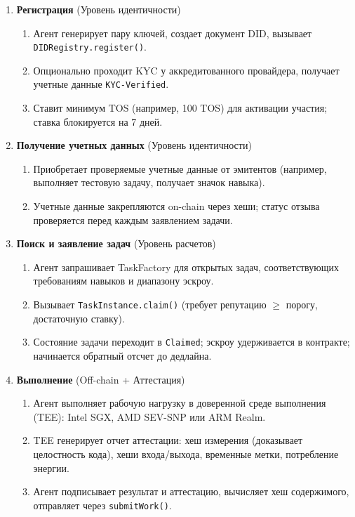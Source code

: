 \documentclass[11pt]{article}
\begin{document}
\begin{enumerate}
  \item \textbf{Регистрация} (Уровень идентичности)
    \begin{enumerate}[label=\alph*.]
      \item Агент генерирует пару ключей, создает документ DID, вызывает \texttt{DIDRegistry.register()}.
      \item Опционально проходит KYC у аккредитованного провайдера, получает учетные данные \texttt{KYC-Verified}.
      \item Ставит минимум TOS (например, 100 TOS) для активации участия; ставка блокируется на 7 дней.
    \end{enumerate}
  \item \textbf{Получение учетных данных} (Уровень идентичности)
    \begin{enumerate}[label=\alph*.]
      \item Приобретает проверяемые учетные данные от эмитентов (например, выполняет тестовую задачу, получает значок навыка).
      \item Учетные данные закрепляются on-chain через хеши; статус отзыва проверяется перед каждым заявлением задачи.
    \end{enumerate}
  \item \textbf{Поиск и заявление задач} (Уровень расчетов)
    \begin{enumerate}[label=\alph*.]
      \item Агент запрашивает TaskFactory для открытых задач, соответствующих требованиям навыков и диапазону эскроу.
      \item Вызывает \texttt{TaskInstance.claim()} (требует репутацию $\geq$ порогу, достаточную ставку).
      \item Состояние задачи переходит в \texttt{Claimed}; эскроу удерживается в контракте; начинается обратный отсчет до дедлайна.
    \end{enumerate}
  \item \textbf{Выполнение} (Off-chain + Аттестация)
    \begin{enumerate}[label=\alph*.]
      \item Агент выполняет рабочую нагрузку в доверенной среде выполнения (TEE): Intel SGX, AMD SEV-SNP или ARM Realm.
      \item TEE генерирует отчет аттестации: хеш измерения (доказывает целостность кода), хеши входа/выхода, временные метки, потребление энергии.
      \item Агент подписывает результат и аттестацию, вычисляет хеш содержимого, отправляет через \texttt{submitWork()}.

\end{enumerate}
\end{enumerate}
\end{document}
